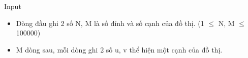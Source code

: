 Input  
\begin{itemize}
	\item     Dòng đầu ghi 2 số N, M là số đỉnh và số cạnh của đồ thị. (1  $\le$  N, M  $\le$  100000)   
\end{itemize}
\begin{itemize}
	\item     M dòng sau, mỗi dòng ghi 2 số u, v thể hiện một cạnh của đồ thị.   
\end{itemize}